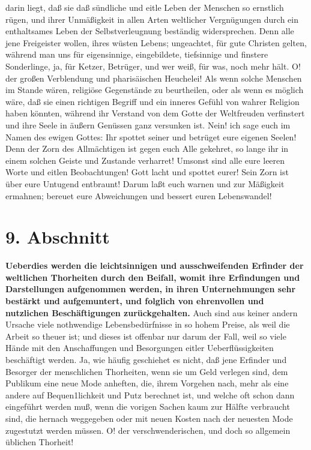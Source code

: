 {darin liegt, daß sie daß sündliche und eitle Leben der Menschen so ernstlich
rügen, und ihrer Unmäßigkeit in allen Arten weltlicher Vergnügungen durch ein
enthaltsames Leben der Selbstverleugnung beständig widersprechen. Denn alle jene
Freigeister wollen, ihres wüsten Lebens;
ungeachtet, für gute Christen gelten,
während man uns für eigensinnige, eingebildete, tiefsinnige und finstere
Sonderlinge, ja, für Ketzer, Betrüger, und wer weiß, für
was, noch mehr hält. O!
der großen Verblendung und pharisäischen Heuchelei! Als wenn solche Menschen im
Stande wären, religiöse Gegenstände zu beurtheilen, oder als wenn es möglich
wäre, daß sie einen richtigen Begriff und ein inneres Gefühl von wahrer Religion
haben könnten, während ihr Verstand von dem Gotte der Weltfreuden verfinstert
und ihre Seele in äußern Genüssen ganz versunken ist. Nein! ich sage euch im
Namen des ewigen Gottes: Ihr spottet seiner und betrüget eure eigenen Seelen!
Denn der Zorn des Allmächtigen ist gegen euch Alle gekehret, so lange ihr in
einem solchen Geiste und Zustande verharret! Umsonst sind alle eure leeren Worte
und eitlen Beobachtungen! Gott lacht und spottet eurer! Sein Zorn ist über eure
Untugend entbraunt! Darum laßt euch warnen und zur Mäßigkeit ermahnen; bereuet
eure Abweichungen und bessert euren Lebenswandel!

\section{9. Abschnitt} \label{kap17_ab9}

\label{ref:17_09_bedarf_wecken}
\textbf{Ueberdies werden die leichtsinnigen und
ausschweifenden Erfinder der weltlichen
Thorheiten durch den Beifall, womit ihre Erfindungen und Darstellungen
aufgenommen werden, in ihren Unternehmungen sehr bestärkt und aufgemuntert, und
folglich von ehrenvollen und nutzlichen Beschäftigungen zurückgehalten.} Auch
sind aus keiner andern Ursache viele nothwendige Lebensbedürfnisse in so hohem
Preise, als weil die Arbeit so theuer ist; und dieses ist offenbar nur darum der
Fall, weil so viele Hände mit den Anschaffungen und Besorgungen eitler
Ueberflüssigkeiten beschäftigt werden. Ja, wie häufig geschiehet es nicht, daß
jene Erfinder und Besorger der menschlichen Thorheiten, wenn sie um Geld
verlegen sind, dem Publikum eine neue Mode anheften, die, ihrem Vorgehen nach,
mehr als eine andere auf Bequen1lichkeit und Putz berechnet ist, und welche oft
schon dann eingeführt werden muß, wenn die vorigen Sachen kaum zur Hälfte
verbraucht sind, die hernach weggegeben oder mit neuen Kosten nach der neuesten
Mode zugestutzt werden müssen. O! der verschwenderischen, und doch so allgemein
üblichen Thorheit!

}
